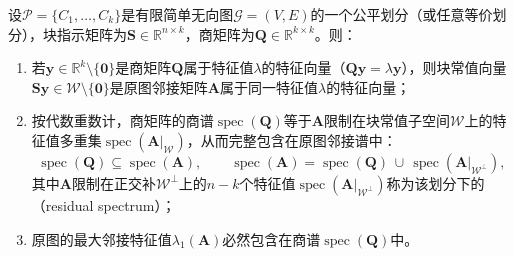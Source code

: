 \begin{theorem}[商谱嵌入定理]
\label{thm:quotient-spectrum-inclusion}
设$\mathcal P=\{C_1,\ldots,C_k\}$是有限简单无向图$\mathcal G=(V,E)$的一个公平划分（或任意等价划分），块指示矩阵为$\bm S\in\mathbb R^{n\times k}$，商矩阵为$\bm Q\in\mathbb R^{k\times k}$。则：
\begin{enumerate}
\item 若$\bm y\in\mathbb R^k\setminus\{\bm 0\}$是商矩阵$\bm Q$属于特征值$\lambda$的特征向量（$\bm Q\bm y=\lambda\bm y$），则块常值向量$\bm S\bm y\in\mathcal W\setminus\{\bm 0\}$是原图邻接矩阵$\bm A$属于同一特征值$\lambda$的特征向量；
\item 按代数重数计，商矩阵的商谱$\operatorname{spec}(\bm Q)$等于$\bm A$限制在块常值子空间$\mathcal W$上的特征值多重集$\operatorname{spec}(\bm A|_{\mathcal W})$，从而完整包含在原图邻接谱中：
\[
\operatorname{spec}(\bm Q)\subseteq\operatorname{spec}(\bm A),\qquad
\operatorname{spec}(\bm A)=\operatorname{spec}(\bm Q)\,\cup\,\operatorname{spec}(\bm A|_{\mathcal W^\perp}),
\]
其中$\bm A$限制在正交补$\mathcal W^\perp$上的$n-k$个特征值$\operatorname{spec}(\bm A|_{\mathcal W^\perp})$称为该划分下的（residual spectrum）；
\item 原图的最大邻接特征值$\lambda_1(\bm A)$必然包含在商谱$\operatorname{spec}(\bm Q)$中。
\end{enumerate}
\end{theorem}

